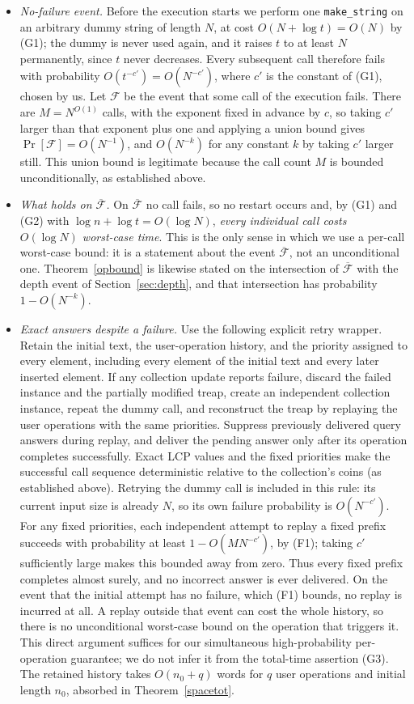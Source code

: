﻿\documentclass[11pt]{article}
\theoremstyle{plain}
\theoremstyle{remark}
\begin{document}
\begin{itemize}
\item[(F1)] \emph{No-failure event.} Before the execution starts we perform one \texttt{make\_string} on an arbitrary dummy string of length $N$, at cost $O(N+\log t)=O(N)$ by (G1); the dummy is never used again, and it raises $t$ to at least $N$ permanently, since $t$ never decreases. Every subsequent call therefore fails with probability $O(t^{-c'})=O(N^{-c'})$, where $c'$ is the constant of (G1), chosen by us. Let $\mathcal F$ be the event that some call of the execution fails. There are $M=N^{O(1)}$ calls, with the exponent fixed in advance by $c$, so taking $c'$ larger than that exponent plus one and applying a union bound gives $\Pr[\mathcal F]=O(N^{-1})$, and $O(N^{-k})$ for any constant $k$ by taking $c'$ larger still. This union bound is legitimate because the call count $M$ is bounded unconditionally, as established above.
\item[(F2)] \emph{What holds on $\overline{\mathcal F}$.} On $\overline{\mathcal F}$ no call fails, so no restart occurs and, by (G1) and (G2) with $\log n+\log t=O(\log N)$, \emph{every individual call costs $O(\log N)$ worst-case time}. This is the only sense in which we use a per-call worst-case bound: it is a statement about the event $\overline{\mathcal F}$, not an unconditional one. Theorem~\ref{opbound} is likewise stated on the intersection of $\overline{\mathcal F}$ with the depth event of Section~\ref{sec:depth}, and that intersection has probability $1-O(N^{-k})$.
\item[(F3)] \emph{Exact answers despite a failure.} Use the following explicit retry wrapper. Retain the initial text, the user-operation history, and the priority assigned to every element, including every element of the initial text and every later inserted element. If any collection update reports failure, discard the failed instance and the partially modified treap, create an independent collection instance, repeat the dummy call, and reconstruct the treap by replaying the user operations with the same priorities. Suppress previously delivered query answers during replay, and deliver the pending answer only after its operation completes successfully. Exact LCP values and the fixed priorities make the successful call sequence deterministic relative to the collection's coins (as established above). Retrying the dummy call is included in this rule: its current input size is already $N$, so its own failure probability is $O(N^{-c'})$. For any fixed priorities, each independent attempt to replay a fixed prefix succeeds with probability at least $1-O(MN^{-c'})$, by (F1); taking $c'$ sufficiently large makes this bounded away from zero. Thus every fixed prefix completes almost surely, and no incorrect answer is ever delivered. On the event that the initial attempt has no failure, which (F1) bounds, no replay is incurred at all. A replay outside that event can cost the whole history, so there is no unconditional worst-case bound on the operation that triggers it. This direct argument suffices for our simultaneous high-probability per-operation guarantee; we do not infer it from the total-time assertion (G3). The retained history takes $O(n_0+q)$ words for $q$ user operations and initial length $n_0$, absorbed in Theorem~\ref{spacetot}.

\end{itemize}
\end{document}
